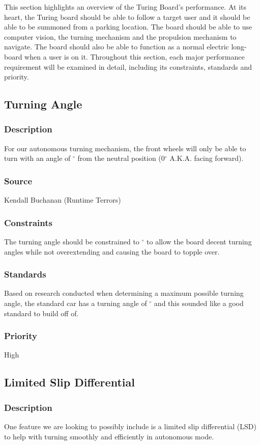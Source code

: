 This section highlights an overview of the Turing Board's performance. At its heart, the Turing board should be able to follow a target user and it should be able to be summoned from a parking location. The board should be able to use computer vision, the turning mechanism and the propulsion mechanism to navigate. The board should also be able to function as a normal electric long-board when a user is on it. Throughout this section, each major performance requirement will be examined in detail, including its constraints, standards and priority.

\subsection{Turning Angle}
\subsubsection{Description}
For our autonomous turning mechanism, the front wheels will only be able to turn with an angle of $^{\circ}$ from the neutral position (0$^{\circ}$ A.K.A. facing forward).
\subsubsection{Source}
Kendall Buchanan (Runtime Terrors)
\subsubsection{Constraints}
The turning angle should be constrained to $^{\circ}$ to allow the board decent turning angles while not overextending and causing the board to topple over.
\subsubsection{Standards}
Based on research conducted when determining a maximum possible turning angle, the standard car has a turning angle of $^{\circ}$ and this sounded like a good standard to build off of.
\subsubsection{Priority}
High

\subsection{Limited Slip Differential}
\subsubsection{Description}
One feature we are looking to possibly include is a limited slip differential (LSD) to help with turning smoothly and efficiently in autonomous mode.
